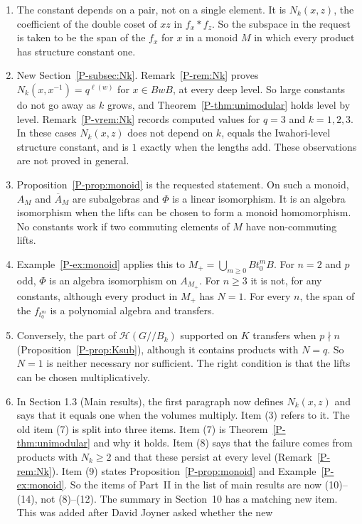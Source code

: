 \documentclass[12pt,letterpaper]{amsart}
\begin{document}
\begin{enumerate}[leftmargin=1.5em]
\item The constant depends on a pair, not on a single element. It is
$N_k(x,z)$, the coefficient of the double coset of $xz$ in $f_x*f_z$.
So the subspace in the request is taken to be the span of the $f_x$ for
$x$ in a monoid $M$ in which every product has structure constant one.
\item New Section~\ref{P-subsec:Nk}. Remark~\ref{P-rem:Nk} proves
$N_k(x,x^{-1})=q^{\ell(w)}$ for $x\in BwB$, at every deep level. So
large constants do not go away as $k$ grows, and
Theorem~\ref{P-thm:unimodular} holds level by level.
Remark~\ref{P-vrem:Nk} records computed values for $q=3$ and
$k=1,2,3$. In these cases $N_k(x,z)$ does not depend on $k$, equals
the Iwahori-level structure constant, and is $1$ exactly when the
lengths add. These observations are not proved in general.
\item Proposition~\ref{P-prop:monoid} is the requested statement. On
such a monoid, $A_M$ and $\overline{A}_M$ are subalgebras and $\Phi$ is
a linear isomorphism. It is an algebra isomorphism when the lifts can
be chosen to form a monoid homomorphism. No constants work if two
commuting elements of $M$ have non-commuting lifts.
\item Example~\ref{P-ex:monoid} applies this to
$M_+=\bigcup_{m\geq0}Bt_0^mB$. For $n=2$ and $p$ odd, $\Phi$ is an
algebra isomorphism on $A_{M_+}$. For $n\geq3$ it is not, for any
constants, although every product in $M_+$ has $N=1$. For every $n$,
the span of the $f_{t_0^m}$ is a polynomial algebra and transfers.
\item Conversely, the part of $\mathcal{H}(G/\!/B_k)$ supported on $K$ transfers when
$p\nmid n$ (Proposition~\ref{P-prop:Ksub}), although it contains
products with $N=q$. So $N=1$ is neither necessary nor sufficient. The
right condition is that the lifts can be chosen multiplicatively.
\item In Section 1.3 (Main results), the first paragraph now defines
$N_k(x,z)$ and says that it equals one when the volumes multiply. Item
(3) refers to it. The old item (7) is split into three items. Item (7)
is Theorem~\ref{P-thm:unimodular} and why it holds. Item (8) says that
the failure comes from products with $N_k\geq2$ and that these persist
at every level (Remark~\ref{P-rem:Nk}). Item (9) states
Proposition~\ref{P-prop:monoid} and Example~\ref{P-ex:monoid}. So the
items of Part~II in the list of main results are now (10)--(14), not
(8)--(12). The summary in Section~10 has a matching new item. This was added after David Joyner asked whether the new

\end{enumerate}
\end{document}
